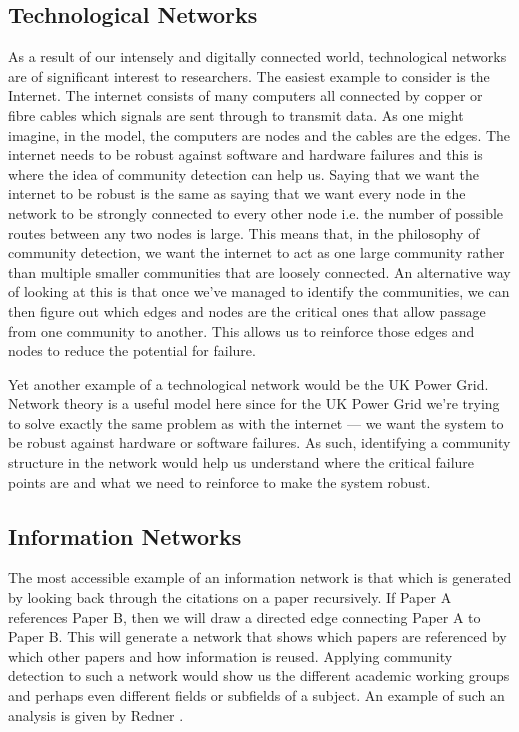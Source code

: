 \subsection{Technological Networks}\label{sec:Technological Networks}
As a result of our intensely and digitally connected world, technological networks are of significant interest to researchers. The easiest example to consider is the Internet. The internet consists of many computers all connected by copper or fibre cables which signals are sent through to transmit data. As one might imagine, in the model, the computers are nodes and the cables are the edges. The internet needs to be robust against software and hardware failures and this is where the idea of community detection can help us. Saying that we want the internet to be robust is the same as saying that we want every node in the network to be strongly connected to every other node i.e. the number of possible routes between any two nodes is large. This means that, in the philosophy of community detection, we want the internet to act as one large community rather than multiple smaller communities that are loosely connected. An alternative way of looking at this is that once we've managed to identify the communities, we can then figure out which edges and nodes are the critical ones that allow passage from one community to another. This allows us to reinforce those edges and nodes to reduce the potential for failure.

Yet another example of a technological network would be the UK Power Grid. Network theory is a useful model here since for the UK Power Grid we're trying to solve exactly the same problem as with the internet --- we want the system to be robust against hardware or software failures. As such, identifying a community structure in the network would help us understand where the critical failure points are and what we need to reinforce to make the system robust.

\subsection{Information Networks}\label{sec:Information Networks}
The most accessible example of an information network is that which is generated by looking back through the citations on a paper recursively. If Paper A references Paper B, then we will draw a directed edge connecting Paper A to Paper B. This will generate a network that shows which papers are referenced by which other papers and how information is reused. Applying community detection to such a network would show us the different academic working groups and perhaps even different fields or subfields of a subject. An example of such an analysis is given by Redner \cite{Redner1998}.

